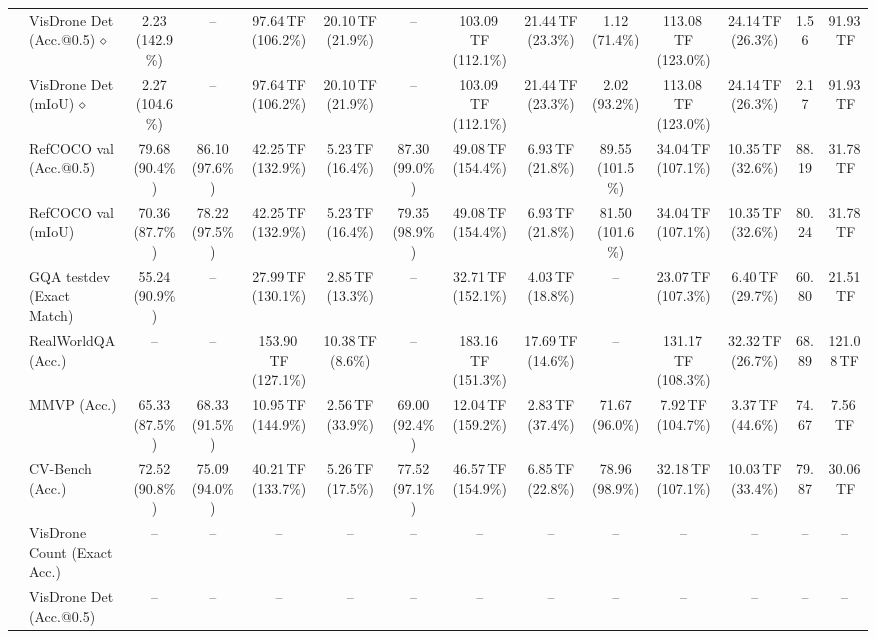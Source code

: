 \begin{table}[t]
\begin{center}
\begin{small}
\begin{sc}
{\begin{tabular}{llcccccccccccc}
& VisDrone Det (Acc.@0.5)\,$\diamond$ & 2.23 (142.9\%) & -- & 97.64\,TF (106.2\%) & 20.10\,TF (21.9\%) & -- & 103.09\,TF (112.1\%) & 21.44\,TF (23.3\%) & 1.12 (71.4\%) & 113.08\,TF (123.0\%) & 24.14\,TF (26.3\%) & 1.56 & 91.93\,TF \\
& VisDrone Det (mIoU)\,$\diamond$ & 2.27 (104.6\%) & -- & 97.64\,TF (106.2\%) & 20.10\,TF (21.9\%) & -- & 103.09\,TF (112.1\%) & 21.44\,TF (23.3\%) & 2.02 (93.2\%) & 113.08\,TF (123.0\%) & 24.14\,TF (26.3\%) & 2.17 & 91.93\,TF \\
\midrule
{}
& RefCOCO val (Acc.@0.5) & 79.68 (90.4\%) & 86.10 (97.6\%) & 42.25\,TF (132.9\%) & 5.23\,TF (16.4\%) & 87.30 (99.0\%) & 49.08\,TF (154.4\%) & 6.93\,TF (21.8\%) & 89.55 (101.5\%) & 34.04\,TF (107.1\%) & 10.35\,TF (32.6\%) & 88.19 & 31.78\,TF \\
& RefCOCO val (mIoU) & 70.36 (87.7\%) & 78.22 (97.5\%) & 42.25\,TF (132.9\%) & 5.23\,TF (16.4\%) & 79.35 (98.9\%) & 49.08\,TF (154.4\%) & 6.93\,TF (21.8\%) & 81.50 (101.6\%) & 34.04\,TF (107.1\%) & 10.35\,TF (32.6\%) & 80.24 & 31.78\,TF \\
& GQA testdev (Exact Match) & 55.24 (90.9\%) & -- & 27.99\,TF (130.1\%) & 2.85\,TF (13.3\%) & -- & 32.71\,TF (152.1\%) & 4.03\,TF (18.8\%) & -- & 23.07\,TF (107.3\%) & 6.40\,TF (29.7\%) & 60.80 & 21.51\,TF \\
& RealWorldQA (Acc.) & -- & -- & 153.90\,TF (127.1\%) & 10.38\,TF (8.6\%) & -- & 183.16\,TF (151.3\%) & 17.69\,TF (14.6\%) & -- & 131.17\,TF (108.3\%) & 32.32\,TF (26.7\%) & 68.89 & 121.08\,TF \\
& MMVP (Acc.) & 65.33 (87.5\%) & 68.33 (91.5\%) & 10.95\,TF (144.9\%) & 2.56\,TF (33.9\%) & 69.00 (92.4\%) & 12.04\,TF (159.2\%) & 2.83\,TF (37.4\%) & 71.67 (96.0\%) & 7.92\,TF (104.7\%) & 3.37\,TF (44.6\%) & 74.67 & 7.56\,TF \\
& CV-Bench (Acc.) & 72.52 (90.8\%) & 75.09 (94.0\%) & 40.21\,TF (133.7\%) & 5.26\,TF (17.5\%) & 77.52 (97.1\%) & 46.57\,TF (154.9\%) & 6.85\,TF (22.8\%) & 78.96 (98.9\%) & 32.18\,TF (107.1\%) & 10.03\,TF (33.4\%) & 79.87 & 30.06\,TF \\
& VisDrone Count (Exact Acc.) & -- & -- & -- & -- & -- & -- & -- & -- & -- & -- & -- & -- \\
& VisDrone Det (Acc.@0.5) & -- & -- & -- & -- & -- & -- & -- & -- & -- & -- & -- & -- \\

\end{tabular}}
\end{sc}
\end{small}
\end{center}
\end{table}
